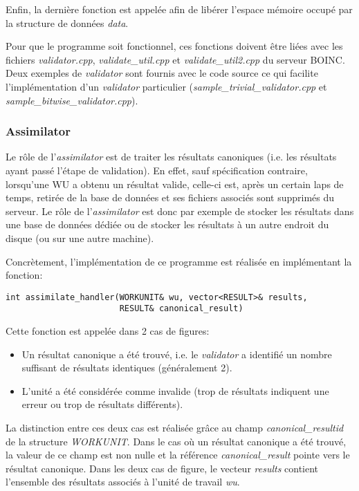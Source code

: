 \documentclass[a4paper, 12pt]{report}
\begin{document}
Enfin, la dernière fonction est appelée afin de libérer l'espace mémoire occupé par la structure de données \textit{data}.

Pour que le programme soit fonctionnel, ces fonctions doivent être liées avec les fichiers \textit{validator.cpp}, \textit{validate\_util.cpp} et \textit{validate\_util2.cpp} du serveur \textsc{BOINC}. Deux exemples de \textit{validator} sont fournis avec le code source ce qui facilite l'implémentation d'un \textit{validator} particulier (\textit{sample\_trivial\_validator.cpp} et \textit{sample\_bitwise\_validator.cpp}).
\newpage
\subsubsection{Assimilator}
Le rôle de l'\textit{assimilator} est de traiter les résultats canoniques (i.e. les résultats ayant passé l'étape de validation). En effet, sauf spécification contraire, lorsqu'une WU a obtenu un résultat valide, celle-ci est, après un certain laps de temps, retirée de la base de données et ses fichiers associés sont supprimés du serveur. Le rôle de l'\textit{assimilator} est donc par exemple de stocker les résultats dans une base de données dédiée ou de stocker les résultats à un autre endroit du disque (ou sur une autre machine).

Concrètement, l'implémentation de ce programme est réalisée en implémentant la fonction:
\begin{verbatim}
int assimilate_handler(WORKUNIT& wu, vector<RESULT>& results, 
                       RESULT& canonical_result)
\end{verbatim}

Cette fonction est appelée dans 2 cas de figures:
\begin{itemize}
\item Un résultat canonique a été trouvé, i.e. le \textit{validator} a identifié un nombre suffisant de résultats identiques (généralement 2).
\item L'unité a été considérée comme invalide (trop de résultats indiquent une erreur ou trop de résultats différents).
\end{itemize}
La distinction entre ces deux cas est réalisée grâce au champ \textit{canonical\_resultid} de la structure \textit{WORKUNIT}. Dans le cas où un résultat canonique a été trouvé, la valeur de ce champ est non nulle et la référence \textit{canonical\_result} pointe vers le résultat canonique. Dans les deux cas de figure, le vecteur \textit{results} contient l'ensemble des résultats associés à l'unité de travail \textit{wu}.
\end{document}
